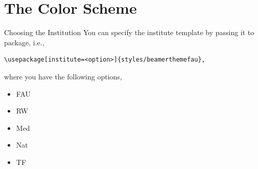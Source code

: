 \section{The Color Scheme}
%
%
%
%
%
\begin{frame}[fragile]{Choosing the Institution}
You can specify the institute template by passing it to package, i.e.,
%
\begin{center}
\begin{verbatim}
\usepackage[institute=<option>]{styles/beamerthemefau},
\end{verbatim}
\end{center}
%
where you have the following options,
\begin{itemize}
\item FAU
\item RW
\item Med
\item Nat
\item TF
\end{itemize}
\end{frame}
%
%
%
%
%
